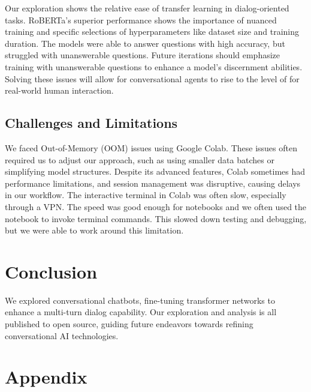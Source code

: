\documentclass[12pt]{extarticle}
\begin{document}
Our exploration shows the relative ease of transfer learning in dialog-oriented tasks. RoBERTa's superior performance shows the importance of nuanced training and specific selections of hyperparameters like dataset size and training duration. The models were able to answer questions with high accuracy, but struggled with unanswerable questions. Future iterations should emphasize training with unanswerable questions to enhance a model's discernment abilities. Solving these issues will allow for conversational agents to rise to the level of for real-world human interaction.

\subsection{Challenges and Limitations}

We faced Out-of-Memory (OOM) issues using Google Colab. These issues often required us to adjust our approach, such as using smaller data batches or simplifying model structures. Despite its advanced features, Colab sometimes had performance limitations, and session management was disruptive, causing delays in our workflow. The interactive terminal in Colab was often slow, especially through a VPN. The speed was good enough for notebooks and we often used the notebook to invoke terminal commands. This slowed down testing and debugging, but we were able to work around this limitation.

\section{Conclusion}

We explored conversational chatbots, fine-tuning transformer networks to enhance a multi-turn dialog capability. Our exploration and analysis is all published to open source, guiding future endeavors towards refining conversational AI technologies.

\newpage

\printbibliography

\newpage

\appendix
\section{Appendix}
\end{document}
